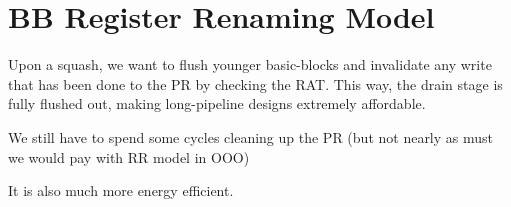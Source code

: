 \section{BB Register Renaming Model}
\label{sec:bb_reg_ren}

Upon a squash, we want to flush younger basic-blocks and invalidate any write
that has been done to the PR by checking the RAT. This way, the drain stage is
fully flushed out, making long-pipeline designs extremely affordable.

We still have to spend some cycles cleaning up the PR (but not nearly as must we
        would pay with RR model in OOO)

It is also much more energy efficient.
